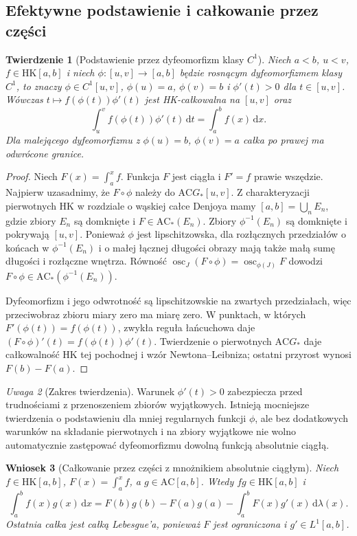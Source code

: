 \documentclass[11pt,a4paper]{article}
\numberwithin{equation}{section}
\theoremstyle{plain}
\newtheorem{twierdzenie}{Twierdzenie}[section]
\newtheorem{wniosek}[twierdzenie]{Wniosek}
\theoremstyle{definition}
\theoremstyle{remark}
\newtheorem{uwaga}[twierdzenie]{Uwaga}
\newcommand{\osc}{\operatorname{osc}}
\newcommand{\AC}{\mathrm{AC}}
\newcommand{\HK}{\mathrm{HK}}
\begin{document}
\subsection*{Efektywne podstawienie i całkowanie przez części}
\begin{twierdzenie}[Podstawienie przez dyfeomorfizm klasy $C^1$]\label{tw:hk-podstawienie}
Niech $a<b$, $u<v$, $f\in\HK[a,b]$ i niech $\phi:[u,v]\to[a,b]$ będzie rosnącym dyfeomorfizmem klasy $C^1$, to znaczy $\phi\in C^1[u,v]$, $\phi(u)=a$, $\phi(v)=b$ i $\phi'(t)>0$ dla $t\in[u,v]$. Wówczas $t\mapsto f(\phi(t))\phi'(t)$ jest HK-całkowalna na $[u,v]$ oraz
\[
\int_u^v f(\phi(t))\phi'(t)\,\mathrm dt=\int_a^b f(x)\,\mathrm dx.
\]
Dla malejącego dyfeomorfizmu z $\phi(u)=b$, $\phi(v)=a$ całka po prawej ma odwrócone granice.
\end{twierdzenie}
\begin{proof}
Niech $F(x)=\int_a^x f$. Funkcja $F$ jest ciągła i $F'=f$ prawie wszędzie. Najpierw uzasadnimy, że $F\circ\phi$ należy do $\AC G_*[u,v]$. Z charakteryzacji pierwotnych HK w rozdziale o wąskiej całce Denjoya mamy $[a,b]=\bigcup_n E_n$, gdzie zbiory $E_n$ są domknięte i $F\in\AC_*(E_n)$. Zbiory $\phi^{-1}(E_n)$ są domknięte i pokrywają $[u,v]$. Ponieważ $\phi$ jest lipschitzowska, dla rozłącznych przedziałów o końcach w $\phi^{-1}(E_n)$ i o małej łącznej długości obrazy mają także małą sumę długości i rozłączne wnętrza. Równość
$\osc_J(F\circ\phi)=\osc_{\phi(J)}F$ dowodzi $F\circ\phi\in\AC_*(\phi^{-1}(E_n))$.

Dyfeomorfizm i jego odwrotność są lipschitzowskie na zwartych przedziałach, więc przeciwobraz zbioru miary zero ma miarę zero. W punktach, w których $F'(\phi(t))=f(\phi(t))$, zwykła reguła łańcuchowa daje $(F\circ\phi)'(t)=f(\phi(t))\phi'(t)$. Twierdzenie o pierwotnych $\AC G_*$ daje całkowalność HK tej pochodnej i wzór Newtona--Leibniza; ostatni przyrost wynosi $F(b)-F(a)$.
\end{proof}
\begin{uwaga}[Zakres twierdzenia]
Warunek $\phi'(t)>0$ zabezpiecza przed trudnościami z przenoszeniem zbiorów wyjątkowych. Istnieją mocniejsze twierdzenia o podstawieniu dla mniej regularnych funkcji $\phi$, ale bez dodatkowych warunków na składanie pierwotnych i na zbiory wyjątkowe nie wolno automatycznie zastępować dyfeomorfizmu dowolną funkcją absolutnie ciągłą.
\end{uwaga}
\begin{wniosek}[Całkowanie przez części z mnożnikiem absolutnie ciągłym]\label{wn:hk-ibp-ac}
Niech $f\in\HK[a,b]$, $F(x)=\int_a^x f$, a $g\in\AC[a,b]$. Wtedy $fg\in\HK[a,b]$ i
\[
\int_a^b f(x)g(x)\,\mathrm dx=F(b)g(b)-F(a)g(a)-\int_a^b F(x)g'(x)\,\mathrm d\lambda(x).
\]
Ostatnia całka jest całką Lebesgue'a, ponieważ $F$ jest ograniczona i $g'\in L^1[a,b]$.
\end{wniosek}
\end{document}
